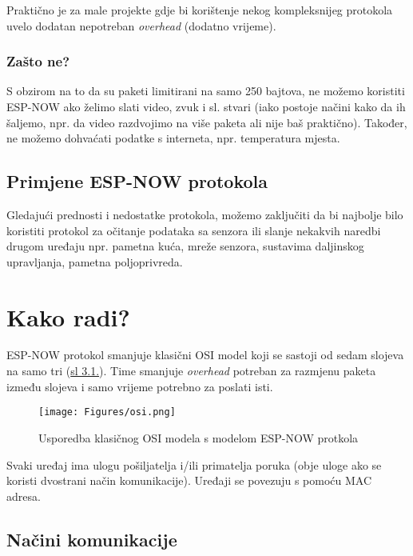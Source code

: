 \documentclass[seminarskirad]{fer}
\begin{document}
Praktično je za male projekte gdje bi korištenje nekog kompleksnijeg protokola uvelo dodatan nepotreban \textit{overhead} (dodatno vrijeme).

\subsection{Zašto ne?}

S obzirom na to da su paketi limitirani na samo 250 bajtova, ne možemo koristiti ESP-NOW ako želimo slati video, zvuk i sl. stvari (iako postoje načini kako da ih šaljemo, npr. da video razdvojimo na više paketa ali nije baš praktično). Također, ne možemo dohvaćati podatke s interneta, npr. temperatura mjesta.

\section{Primjene ESP-NOW protokola}

Gledajući prednosti i nedostatke protokola, možemo zaključiti da bi najbolje bilo koristiti protokol za očitanje podataka sa senzora ili slanje nekakvih naredbi drugom uređaju npr. pametna kuća, mreže senzora, sustavima daljinskog upravljanja, pametna poljoprivreda.


\chapter{Kako radi?}
\label{pog:kako_radi}

ESP-NOW protokol smanjuje klasični OSI model koji se sastoji od sedam slojeva na samo tri (\hyperref[slk:usporedbaosi]{sl 3.1.}). Time smanjuje \textit{overhead} potreban za razmjenu paketa između slojeva i samo vrijeme potrebno za poslati isti.

\begin{figure}[h!]
  \centering
  \texttt{[image: Figures/osi.png]} 
  \caption{Usporedba klasičnog OSI modela s modelom ESP-NOW protkola}
  \label{slk:usporedbaosi}
\end{figure}

Svaki uređaj ima ulogu pošiljatelja i/ili primatelja poruka (obje uloge ako se koristi dvostrani način komunikacije). Uređaji se povezuju s pomoću MAC adresa. 

\section{Načini komunikacije}
\end{document}
